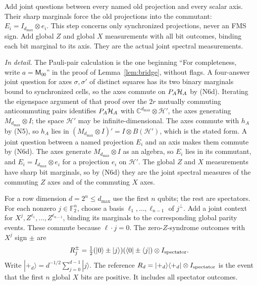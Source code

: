 Add joint questions between every named old projection and every scalar axis. Their sharp marginals force the old projections into the commutant: $E_i=I_{d_{\max}}\otimes e_i$. This step concerns only synchronized projections, never an FMS sign. Add global $Z$ and global $X$ measurements with all bit outcomes, binding each bit marginal to its axis. They are the actual joint spectral measurements.

\emph{In detail.} The Pauli-pair calculation is the one beginning
``For completeness, write $a=\mathsf M_{00}$'' in the proof of
Lemma~\ref{lem:bridge}, without flags. A four-answer joint question for axes $\sigma,\sigma'$ of distinct squares has its two binary marginals bound to synchronized cells, so the axes commute on $P_A\mathcal H_A$ by (N6d). Iterating the eigenspace argument of that proof over the $2r$ mutually commuting anticommuting pairs identifies $P_A\mathcal H_A$ with $\mathbb C^{d_{\max}}\otimes\mathcal H'$, the axes generating $M_{d_{\max}}\otimes I$; the space $\mathcal H'$ may be infinite-dimensional. The axes commute with $h_A$ by (N5), so $h_A$ lies in $(M_{d_{\max}}\otimes I)'=I\otimes B(\mathcal H')$, which is the stated form. A joint question between a named projection $E_i$ and an axis makes them commute by (N6d). The axes generate $M_{d_{\max}}\otimes I$ as an algebra, so $E_i$ lies in its commutant, and $E_i=I_{d_{\max}}\otimes e_i$ for a projection $e_i$ on $\mathcal H'$. The global $Z$ and $X$ measurements have sharp bit marginals, so by (N6d) they are the joint spectral measures of the commuting $Z$ axes and of the commuting $X$ axes.

For a row dimension $d=2^n\leq d_{\max}$ use the first $n$ qubits; the rest are spectators. For each nonzero $j\in\mathbb F_2^n$, choose a basis $\ell_1,\ldots,\ell_{n-1}$ of $j^\perp$. Add a joint context for $X^j,Z^{\ell_1},\ldots,Z^{\ell_{n-1}}$, binding its marginals to the corresponding global parity events. These commute because $\ell\cdot j=0$. The zero-$Z$-syndrome outcomes with $X^j$ sign $\pm$ are
\[
 R_j^\pm=\tfrac12(|0\rangle\pm|j\rangle)(\langle0|\pm\langle j|)
                       \otimes I_{\rm spectator}.
\]
Write $|+_d\rangle=d^{-1/2}\sum_{j=0}^{d-1}|j\rangle$. The reference $R_d=|+_d\rangle\langle+_d|\otimes I_{\rm spectator}$ is the event that the first $n$ global $X$ bits are positive. It includes all spectator outcomes.

